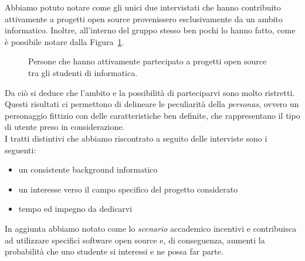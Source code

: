 \documentclass[12pt]{article} %
\begin{document}
Abbiamo potuto notare come gli unici due intervistati che hanno contribuito attivamente a progetti open source provenissero esclusivamente da un ambito informatico. Inoltre, all'interno del gruppo stesso ben pochi lo hanno fatto, come \`e possibile notare dalla Figura~\ref{fig:distribuzioneInformatica}.

\begin{figure}[H]
\caption{Persone che hanno attivamente partecipato a progetti open source tra gli studenti di informatica.}
\label{fig:distribuzioneInformatica}
\end{figure}

Da ci\`o si deduce che l'ambito e la possibilit\`a di parteciparvi sono molto ristretti. Questi risultati ci permettono di delineare le peculiarit\`a della \emph{personas}, ovvero un personaggio fittizio con delle caratteristiche ben definite, che rappresentano il tipo di utente preso in considerazione.\\
I tratti distintivi che abbiamo riscontrato a seguito delle interviste sono i seguenti:
\begin{itemize}
\item un consistente background informatico
\item un interesse verso il campo specifico del progetto considerato
\item tempo ed impegno da dedicarvi
\end{itemize}

In aggiunta abbiamo notato come lo \emph{scenario} accademico incentivi e contribuisca ad utilizzare specifici software open source e, di conseguenza, aumenti la probabilit\`a che uno studente si interessi e ne possa far parte.

\newpage
\end{document}
